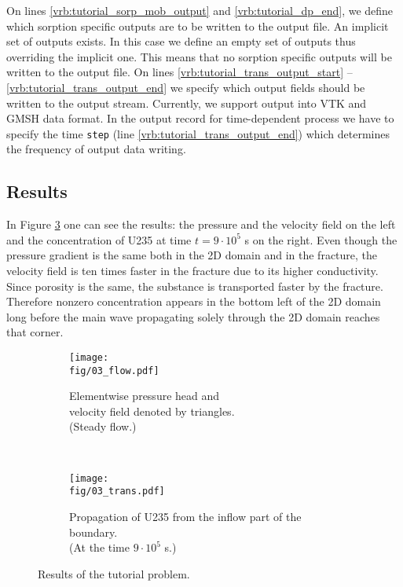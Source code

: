 On lines \ref{vrb:tutorial_sorp_mob_output} and \ref{vrb:tutorial_dp_end}, we define which sorption specific outputs are to be written to the output file. 
An implicit set of outputs exists. In this case we define an empty set of outputs thus overriding the implicit one. 
This means that no sorption specific outputs will be written to the output file.
On lines \ref{vrb:tutorial_trans_output_start} -- \ref{vrb:tutorial_trans_output_end} we specify which output fields should be written to the output stream. Currently, we support output into VTK and GMSH data format.
In the output record for time-dependent process we have to specify the time {\tt step} (line \ref{vrb:tutorial_trans_output_end}) which determines the frequency of output data writing.



\subsection{Results}
In Figure \ref{fig:tutorial} one can see the results: the pressure and the velocity field on the left and the 
concentration of U235 at time $t=9\cdot10^{5}$ s on the right. Even though the pressure gradient is the same both in the 
2D domain and in the fracture, the velocity field is ten times faster in the fracture due to its higher conductivity. 
Since porosity is the same, the substance is transported faster by the fracture. Therefore nonzero concentration appears in the bottom 
left of the 2D domain long before the main wave propagating solely through the 2D domain reaches that corner.


\begin{figure}[!ht]
    \centering
    \begin{subfigure}[b]{0.48\textwidth}
        \centering
        \texttt{[image: \\fig/03\_flow.pdf]}
        \caption{Elementwise pressure head and\\velocity field denoted by triangles.\\ (Steady flow.)}
        \label{fig:tut-flow}
    \end{subfigure}
    ~
    \begin{subfigure}[b]{0.48\textwidth}
        \centering
        \texttt{[image: \\fig/03\_trans.pdf]}
        \caption{Propagation of U235 from the inflow part of the boundary. \\ (At the time $9\cdot10^{5}$ s.)}
        \label{fig:tut-trans}
    \end{subfigure}
    \caption{Results of the tutorial problem.}
    \label{fig:tutorial}
\end{figure}
